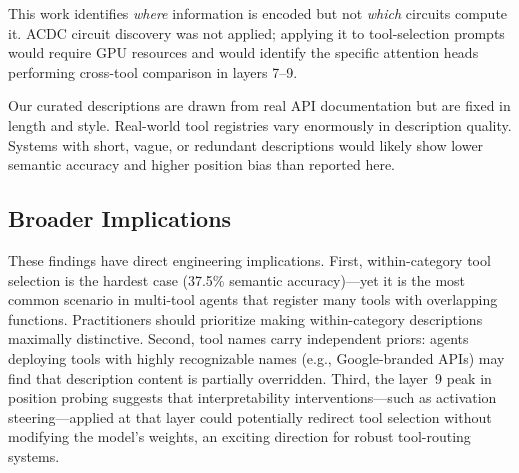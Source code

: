 This work identifies \emph{where} information is encoded but not \emph{which} circuits
compute it.  ACDC circuit discovery \citep{conmy2023acdc} was not applied; applying it
to \gpttwo tool-selection prompts would require GPU resources and would identify the
specific attention heads performing cross-tool comparison in layers 7--9.

Our curated descriptions are drawn from real API documentation but are fixed in length
and style.  Real-world tool registries vary enormously in description quality.  Systems
with short, vague, or redundant descriptions would likely show lower semantic accuracy
and higher position bias than reported here.

\subsection{Broader Implications}

These findings have direct engineering implications.  First, within-category tool
selection is the hardest case (37.5\% semantic accuracy)---yet it is the most common
scenario in multi-tool agents that register many tools with overlapping functions.
Practitioners should prioritize making within-category descriptions maximally distinctive.
Second, tool names carry independent priors: agents deploying tools with highly
recognizable names (e.g., Google-branded APIs) may find that description content is
partially overridden.  Third, the layer~9 peak in position probing suggests that
interpretability interventions---such as activation steering---applied at that layer
could potentially redirect tool selection without modifying the model's weights, an
exciting direction for robust tool-routing systems.
